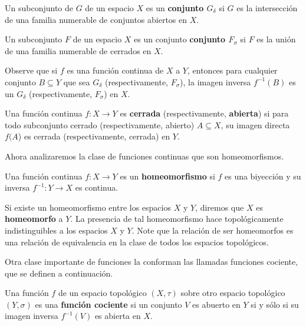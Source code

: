 \documentclass[12pt]{report}
\theoremstyle{largebreak}
\newcommand{\cf}[3]{\ensuremath{#1:#2\rightarrow#3}}
\begin{document}
    \begin{mydef}
        Un subconjunto de $G$ de un espacio $X$ es un \textbf{conjunto $G_\delta$} si $G$ es la intersección de una familia numerable de conjuntos abiertos en $X$.

        Un subconjunto $F$ de un espacio $X$ es un conjunto \textbf{conjunto $F_\sigma$} si $F$ es la unión de una familia numerable de cerrados en $X$.
    \end{mydef}

    \begin{obs}
        Observe que si $f$ es una función continua de $X$ a $Y$, entonces para cualquier conjunto $B\subseteq Y$ que sea $G_\delta$ (respectivamente, $F_\sigma$), la imagen inversa $f^{-1}(B)$ es un $G_\delta$ (respectivamente, $F_\sigma$) en $X$.
    \end{obs}

    \begin{mydef}
        Una función continua $\cf{f}{X}{Y}$ es \textbf{cerrada} (respectivamente, \textbf{abierta}) si para todo subconjunto cerrado (respectivamente, abierto) $A\subseteq X$, su imagen directa $f(A$) es cerrada (respectivamente, cerrada) en $Y$.
    \end{mydef}

    Ahora analizaremos la clase de funciones continuas que son homeomorfismos.
    
    \begin{mydef}
        Una función continua $\cf{f}{X}{Y}$ es un \textbf{homeomorfismo} si $f$ es una biyección y su inversa $\cf{f^{-1}}{Y}{X}$ es continua.
    \end{mydef}

    Si existe un homeomorfismo entre los espacios $X$ y $Y$, diremos que $X$ es \textbf{homeomorfo} a $Y$. La presencia de tal homeomorfismo hace topológicamente indistinguibles a los espacios $X$ y $Y$. Note que la relación de ser homeomorfos es una relación de equivalencia en la clase de todos los espacios topológicos.

    Otra clase importante de funciones la conforman las llamadas funciones cociente, que se definen a continuación.

    \begin{mydef}
        Una función $f$ de un espacio topológico $(X,\tau)$ sobre otro espacio topológico $(Y,\sigma)$ es una \textbf{función cociente} si un conjunto $V$ es abuerto en $Y$ si y sólo si su imagen inversa $f^{-1}(V)$ es abierta en $X$.
    \end{mydef}
\end{document}
